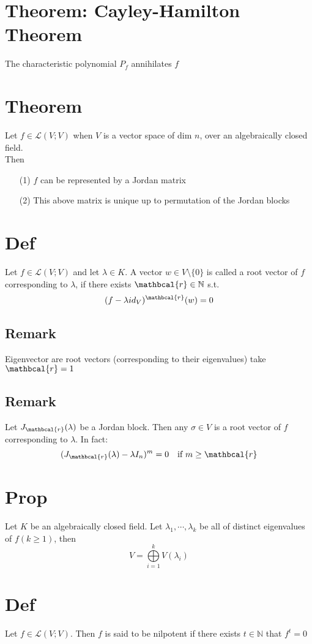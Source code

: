\documentclass{article}
\begin{document}
\section{Theorem: Cayley-Hamilton Theorem}
The characteristic polynomial $P_f$ annihilates $f$
\section{Theorem}Let $f\in\mathscr{L}(V;V)$ when $V$ is a vector space of dim $n$, over an algebraically closed field.\\Then
\begin{itemize}
    \item [(1)]$f$ can be represented by a Jordan matrix
    \item [(2)]This above matrix is unique up to permutation of the Jordan blocks
\end{itemize}
\section{Def}
Let $f\in\mathscr{L}(V;V)$ and let $\lambda\in K$. A vector $w\in V\setminus\{0\}$ is called a root vector of $f$ corresponding to $\lambda$, if there exists $\mathbcal{r}\in\mathbb{N}$ s.t. $$(f-\lambda id_V)^\mathbcal{r}(w)=0$$
\subsection*{Remark}
Eigenvector are root vectors (corresponding to their eigenvalues) take $\mathbcal{r}=1$

\subsection*{Remark}
Let $J_\mathbcal{r}(\lambda)$ be a Jordan block. Then any $\sigma\in V$ is a root vector of $f$ corresponding to $\lambda$. In fact:
$$(J_\mathbcal{r}(\lambda)-\lambda I_n)^m=0\quad\text{if }m\geq\mathbcal{r}$$
\section{Prop}
\label{Prop 48.27}
Let $K$ be an algebraically closed field. Let $\lambda_1,\cdots,\lambda_k$ be all of distinct eigenvalues of $f(k\geq1)$, then 
$$V=\bigoplus\limits_{i=1}^kV(\lambda_i)$$
\section{Def}
Let $f\in  \mathscr{L}(V;V)$. Then $f$ is said to be nilpotent if there exists $t\in \mathbb{N}$ that $f^t=0$
\end{document}
